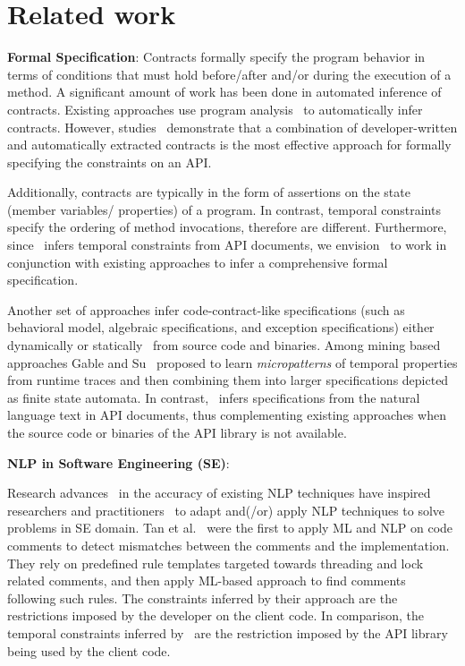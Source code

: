 \section{Related work}
\label{sec:related}

\textbf{Formal Specification}:
Contracts formally specify the program behavior in terms of conditions that must hold before/after and/or during the execution of a method.
A significant amount of work has been done in automated inference of contracts.
Existing approaches use program analysis~\cite{csallner08dysy,NimmerE02:ISSTA,Tillmann:2006:DLM:2105385.2105433}
to automatically infer contracts.
However, studies~\cite{Polikarpova2009ISSTA,Flanagan2001:HAA} demonstrate that a combination of developer-written and automatically extracted
contracts is the most effective approach for formally specifying the constraints on an API.

Additionally, contracts are typically in the form of assertions on the state (member variables/ properties) of a program. In contrast, temporal constraints specify the ordering of method invocations, therefore are different.
Furthermore, since \tool\ infers temporal constraints from API documents, we envision \tool\ to work in conjunction with existing approaches
to infer a comprehensive formal specification.
 
Another set of approaches infer code-contract-like specifications (such as behavioral model, algebraic specifications, and exception specifications) either dynamically\cite{Henkel07discoveringdocumentation,Ghezzi:2009:SIB:1555001.1555057,Henkel:2008:DDA:1363102.1363105} or statically~\cite{Flanagan2001:HAA,Buse:2008:ADI:1390630.1390664,wasylkowski2011mining} from source code and binaries. 
Among mining based approaches Gable and Su~\cite{gabel2008javert} proposed to learn  
\textit{micropatterns} of temporal properties from runtime traces and then combining them into larger specifications depicted as finite state automata.
In contrast, \tool\ infers specifications from the natural language text in API documents,
thus complementing existing approaches when the source code or binaries of the API library is not available.


\textbf{NLP in Software Engineering (SE)}:

Research advances~\cite{Marneffe08COLING,KleinNIPS03} in the accuracy of existing NLP techniques have inspired researchers and practitioners~\cite{pandita12:inferring, pandita13:WHYPER, johnSlankasPASSAT13, XiaoFSE2012, thummalapentaICSE12} to adapt and(/or) apply NLP techniques to solve problems in SE domain. 
Tan et al.~\cite{TanSOSP07} were the first to apply ML and NLP on code comments to detect mismatches between the comments and the implementation.
They rely on predefined rule templates targeted towards threading and lock related comments, and then apply ML-based approach to find comments following such rules.
The constraints inferred by their approach are the restrictions imposed by the developer on the client code.
In comparison, the temporal constraints inferred by \tool\ are the restriction imposed by the API library being used by the client code.

